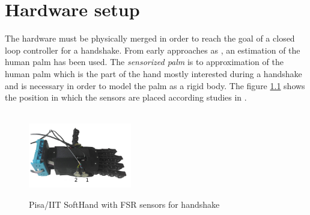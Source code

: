 
\chapter{Hardware setup}
The hardware must be physically merged in order to reach the goal of a closed loop controller for a handshake. From early approaches as \cite{knoop2017handshakiness}, an estimation of the human palm has been used.  The \textit{sensorized palm} is to approximation of the human palm which is the part of the hand mostly interested during a handshake and is necessary in order to model the palm as a rigid body.
The figure \ref{fig:sensorsONhand} shows the position in which the sensors are placed according studies in \cite{knoop2017handshakiness}. \\ \\

\begin{figure}[h]
  \centering
%    
    \includegraphics[width=0.4\textwidth]{Figure/qbhand2.png}
  \label{fig:sensorsONhand}
  \caption{Pisa/IIT SoftHand with FSR sensors for handshake}
\end{figure}



